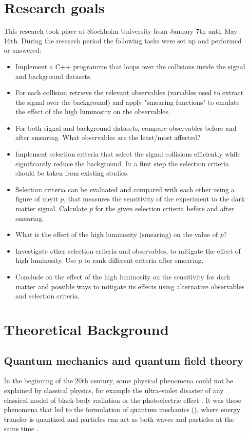 \section{Research goals}\label{sec:goals}
This research took place at Stockholm University from January 7th until May 16th.
During the research period the following tasks were set up and performed or answered:
\begin{itemize}
\item Implement a C++ programme that loops over the collisions inside the signal and background datasets.	
\item For each collision retrieve the relevant observables (variables used to	 extract the signal over the background) and apply "smearing functions" to emulate the effect of the high luminosity on the observables. 	
\item For both signal and background datasets, compare observables before and after smearing. What observables are the least/most affected?	
\item Implement selection criteria that select the signal collisions efficiently while significantly reduce the background. In a first step the selection criteria should be taken from existing studies.
\item Selection criteria can be evaluated and compared with each other using a figure of merit $p$, that measures the sensitivity of the experiment to the dark matter signal. Calculate $p$ for the given selection criteria before and after smearing.
\item What is the effect of the high luminosity (smearing) on the value of $p$?
\item Investigate other selection criteria and observables, to mitigate the effect of high luminosity. Use $p$ to rank different criteria after smearing.
\item Conclude on the effect of the high luminosity on the sensitivity for dark matter and possible ways to mitigate its effects using alternative observables and selection criteria. 
\end{itemize}
\newpage
\section{Theoretical Background}\label{sec:tb}
\subsection{Quantum mechanics and quantum field theory}\label{sec:tb:subsec:qm}
In the beginning of the 20th century, some physical phenomena could not be explained by classical physics, for example the ultra-violet disaster of any classical model of black-body radiation or the photoelectric effect \citep{Bransden:2000}.
It was these phenomena that led to the formulation of quantum mechanics (\abbrQM), where energy transfer is quantized and particles can act as both waves and particles at the same time \citep{Bransden:2000, Hallsjo:2013}.

